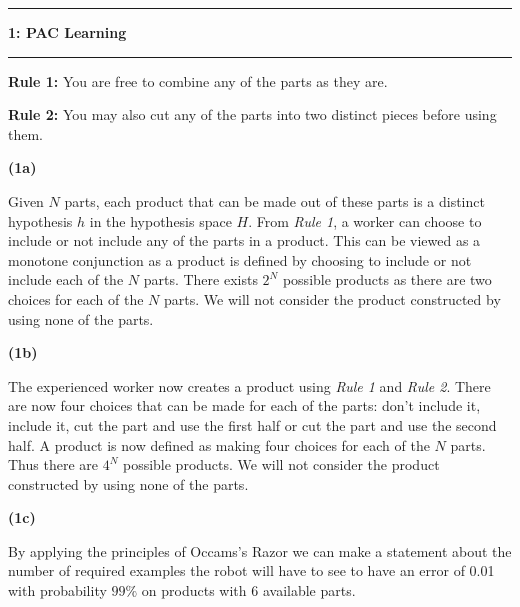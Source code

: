 \documentclass[11pt]{article}
\newcommand\question[2]{\vspace{.25in}\hrule\textbf{#1: #2}\vspace{.5em}\hrule\vspace{.10in}}
\renewcommand\part[1]{\vspace{.10in}\textbf{(#1)}}
\begin{document}
\raggedright
\newcommand\NAME{Jake Pitkin}  %
\newcommand\UID{u0891770}     %
\newcommand\HWNUM{4}              %

\question{1}{PAC Learning}

\textbf{Rule 1:} You are free to combine any of the parts as they are.

\textbf{Rule 2:} You may also cut any of the parts into two distinct pieces before using them.

\part{1a} 

Given $N$ parts, each product that can be made out of these parts is a distinct hypothesis $h$ in the hypothesis space $H$. From \textit{Rule 1}, a worker can choose to include or not include any of the parts in a product. This can be viewed as a monotone conjunction as a product is defined by choosing to include or not include each of the $N$ parts. There exists $2^N$ possible products as there are two choices for each of the $N$ parts. We will not consider the product constructed by using none of the parts.
	

\part{1b}

	The experienced worker now creates a product using \textit{Rule 1} and \textit{Rule 2}. There are now four choices that can be made for each of the parts: don't include it, include it, cut the part and use the first half or cut the part and use the second half. A product is now defined as making four choices for each of the $N$ parts. Thus there are $4^N$ possible products. We will not consider the product constructed by using none of the parts.


\part{1c}

By applying the principles of Occams's Razor we can make a statement about the number of required examples the robot will have to see to have an error of 0.01 with probability $99\%$ on products with 6 available parts.
\end{document}
